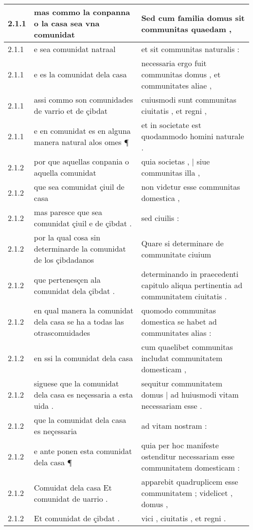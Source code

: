 \begin{tabular}{|p{1cm}|p{6.5cm}|p{6.5cm}|}
2.1.1 & mas commo la conpanna o la casa sea vna comunidat & Sed cum familia domus sit communitas quaedam , \\\hline
2.1.1 & e sea comunidat natraal & et sit communitas naturalis : \\\hline
2.1.1 & e es la comunidat dela casa & necessaria ergo fuit communitas domus , et communitates aliae , \\\hline
2.1.1 & assi commo son comunidades de varrio et de çibdat & cuiusmodi sunt communitas ciuitatis , et regni , \\\hline
2.1.1 & e en comunidat es en alguna manera natural alos omes ¶ & et in societate est quodammodo homini naturale . \\\hline
2.1.2 & por que aquellas conpania o aquella comunidat & quia societas , | siue communitas illa , \\\hline
2.1.2 & que sea comunidat çiuil de casa & non videtur esse communitas domestica , \\\hline
2.1.2 & mas paresce que sea comunidat çiuil e de çibdat . & sed ciuilis : \\\hline
2.1.2 & por la qual cosa sin determinarde la comunidat de los çibdadanos & Quare si determinare de communitate ciuium \\\hline
2.1.2 & que pertenesçen ala comunidat dela çibdat . & determinando in praecedenti capitulo aliqua pertinentia ad communitatem ciuitatis . \\\hline
2.1.2 & en qual manera la comunidat dela casa se ha a todas las otrascomuidades & quomodo communitas domestica se habet ad communitates alias : \\\hline
2.1.2 & en ssi la comunidat dela casa & cum quaelibet communitas includat communitatem domesticam , \\\hline
2.1.2 & siguese que la comunidat dela casa es neçessaria a esta uida . & sequitur communitatem domus | ad huiusmodi vitam necessariam esse . \\\hline
2.1.2 & que la comunidat dela casa es neçessaria & ad vitam nostram : \\\hline
2.1.2 & e ante ponen esta comunidat dela casa ¶ & quia per hoc manifeste ostenditur necessariam esse communitatem domesticam : \\\hline
2.1.2 & Comuidat dela casa Et comunidat de uarrio . & apparebit quadruplicem esse communitatem ; videlicet , domus , \\\hline
2.1.2 & Et comunidat de çibdat . & vici , ciuitatis , et regni . \\\hline

\end{tabular}
